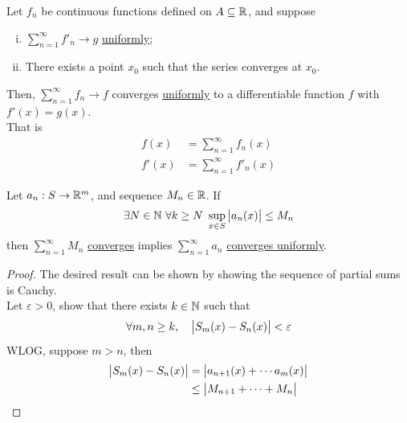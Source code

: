 \documentclass[11pt]{article}
\begin{document}
 	\begin{theorem} 
 		Let $f_n$ be continuous functions defined on $A \subseteq \mathbb{R}$, and suppose
 		\begin{enumerate}[(i)]
 			\item $\sum^\infty_{n=1} f'_n \to g$ \ul{uniformly};
 			\item There exists a point $x_0$ such that the series converges at $x_0$.
 		\end{enumerate}
 		Then, $\sum^\infty_{n=1} f_n \to f$ converges \ul{uniformly} to a differentiable function $f$ with $f'(x) = g(x)$.\\
 		That is
 		\begin{align}
 			f(x) &= \sum_{n=1}^\infty f_n(x) \\
 			f'(x) &= \sum_{n=1}^\infty f'_n(x)
 		\end{align}
 	\end{theorem}
 	
 	\begin{theorem}
 		Let $a_n: S \to \mathbb{R}^m$, and sequence $M_n \in \mathbb{R}$. If
 		\begin{align}
 			\exists N \in \mathbb{N}\ \forall k \geq N\ \sup_{x \in S} \big \vert {a_n(x)} \big \vert \leq M_n
 		\end{align}
 		then $\sum_{n=1}^\infty M_n$ \ul{converges} implies $\sum_{n=1}^\infty a_n$ \ul{converges uniformly}.
 	\end{theorem}
 	
 	\begin{proof}
 		The desired result can be shown by showing the sequence of partial sums is Cauchy. \\
 		Let $\varepsilon > 0$, show that there exists $k \in \mathbb{N}$ such that
 		\begin{align}
 			\forall m, n \geq k,\quad \big \vert {S_m(x) - S_n(x)} \big \vert < \varepsilon
 		\end{align}
 		WLOG, suppose $m > n$, then 
 		\begin{align}
 			\big \vert {S_m(x) - S_n(x)} \big \vert &= \big \vert {a_{n+1}(x) + \cdots a_m(x)} \big \vert \\
 			&\leq \big \vert {M_{n+1} + \cdots + M_n} \big \vert
 		\end{align}
 	\end{proof}
 	
\end{document}
